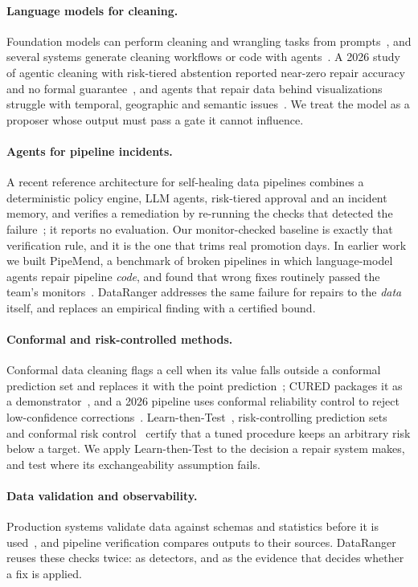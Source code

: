 \paragraph{Language models for cleaning.} Foundation models can perform cleaning and wrangling tasks from prompts~\cite{narayan2022wrangle}, and several systems generate cleaning workflows or code with agents~\cite{autodcworkflow2025,cleaning_agents2025}. A 2026 study of agentic cleaning with risk-tiered abstention reported near-zero repair accuracy and no formal guarantee~\cite{fadlallah2026agentic}, and agents that repair data behind visualizations struggle with temporal, geographic and semantic issues~\cite{kashireddy2026viz}. We treat the model as a proposer whose output must pass a gate it cannot influence.

\paragraph{Agents for pipeline incidents.} A recent reference architecture for self-healing data pipelines combines a deterministic policy engine, LLM agents, risk-tiered approval and an incident memory, and verifies a remediation by re-running the checks that detected the failure~\cite{eshun2026selfhealing}; it reports no evaluation. Our monitor-checked baseline is exactly that verification rule, and it is the one that trims real promotion days. In earlier work we built PipeMend, a benchmark of broken pipelines in which language-model agents repair pipeline \emph{code}, and found that wrong fixes routinely passed the team's monitors~\cite{sharma2026fixorpage}. DataRanger addresses the same failure for repairs to the \emph{data} itself, and replaces an empirical finding with a certified bound.

\paragraph{Conformal and risk-controlled methods.} Conformal data cleaning flags a cell when its value falls outside a conformal prediction set and replaces it with the point prediction~\cite{jaeger2024cdc}; CURED packages it as a demonstrator~\cite{biessmann2026cured}, and a 2026 pipeline uses conformal reliability control to reject low-confidence corrections~\cite{liu2026progressive}. Learn-then-Test~\cite{angelopoulos2021ltt}, risk-controlling prediction sets~\cite{bates2021rcps} and conformal risk control~\cite{angelopoulos2024crc} certify that a tuned procedure keeps an arbitrary risk below a target. We apply Learn-then-Test to the decision a repair system makes, and test where its exchangeability assumption fails.

\paragraph{Data validation and observability.} Production systems validate data against schemas and statistics before it is used~\cite{breck2019tfdv,schelter2018deequ}, and pipeline verification compares outputs to their sources. DataRanger reuses these checks twice: as detectors, and as the evidence that decides whether a fix is applied.
